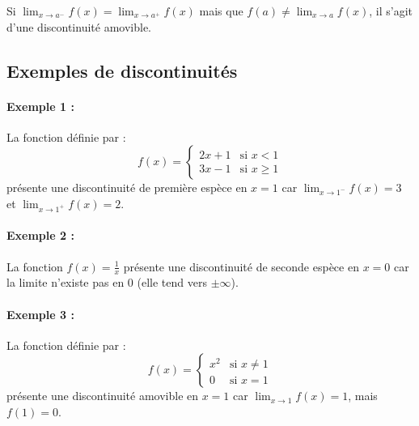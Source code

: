 \documentclass{article}
\begin{document}
	Si \( \lim_{x \to a^-} f(x) = \lim_{x \to a^+} f(x) \) mais que \( f(a) \neq \lim_{x \to a} f(x) \), il s'agit d'une discontinuité amovible.
	
	\subsection{Exemples de discontinuités}
	
	\paragraph
	{Exemple 1 :} La fonction définie par :
	\[
	f(x) =
	\begin{cases}
		2x + 1 & \text{si } x < 1 \\
		3x - 1 & \text{si } x \geq 1
	\end{cases}
	\]
	présente une discontinuité de première espèce en \( x = 1 \) car \( \lim_{x \to 1^-} f(x) = 3 \) et \( \lim_{x \to 1^+} f(x) = 2 \).
	
	\paragraph {Exemple 2 :} La fonction \( f(x) = \frac{1}{x} \) présente une discontinuité de seconde espèce en \( x = 0 \) car la limite n'existe pas en \( 0 \) (elle tend vers \( \pm \infty \)).

	
	\paragraph	{Exemple 3 :} La fonction définie par :
	\[
	f(x) =
	\begin{cases}
		x^2 & \text{si } x \neq 1 \\
		0 & \text{si } x = 1
	\end{cases}
	\]
	présente une discontinuité amovible en \( x = 1 \) car \( \lim_{x \to 1} f(x) = 1 \), mais \( f(1) = 0 \).
	
	
	
	
	
	
	
	
\end{document}
